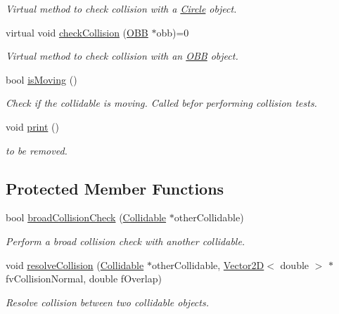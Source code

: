 \begin{DoxyCompactItemize}
\begin{DoxyCompactList}\small\item\em Virtual method to check collision with a \hyperlink{class_circle}{Circle} object. \end{DoxyCompactList}\item 
\hypertarget{class_collidable_a90789947098d0f6f43e3ef8a944a5657}{}virtual void \hyperlink{class_collidable_a90789947098d0f6f43e3ef8a944a5657}{check\+Collision} (\hyperlink{class_o_b_b}{O\+B\+B} $\ast$obb)=0\label{class_collidable_a90789947098d0f6f43e3ef8a944a5657}

\begin{DoxyCompactList}\small\item\em Virtual method to check collision with an \hyperlink{class_o_b_b}{O\+B\+B} object. \end{DoxyCompactList}\item 
\hypertarget{class_collidable_a8d46b697385b10bc9447f1ac18a587a6}{}bool \hyperlink{class_collidable_a8d46b697385b10bc9447f1ac18a587a6}{is\+Moving} ()\label{class_collidable_a8d46b697385b10bc9447f1ac18a587a6}

\begin{DoxyCompactList}\small\item\em Check if the collidable is moving. Called befor performing collision tests. \end{DoxyCompactList}\item 
\hypertarget{class_collidable_ac4597915c92e32ea10220808da31c750}{}void \hyperlink{class_collidable_ac4597915c92e32ea10220808da31c750}{print} ()\label{class_collidable_ac4597915c92e32ea10220808da31c750}

\begin{DoxyCompactList}\small\item\em to be removed. \end{DoxyCompactList}\end{DoxyCompactItemize}
\subsection*{Protected Member Functions}
\begin{DoxyCompactItemize}
\item 
bool \hyperlink{class_collidable_a3d3ce584cdb14485db044c81a792a966}{broad\+Collision\+Check} (\hyperlink{class_collidable}{Collidable} $\ast$other\+Collidable)
\begin{DoxyCompactList}\small\item\em Perform a broad collision check with another collidable. \end{DoxyCompactList}\item 
void \hyperlink{class_collidable_a40089393c9a030b68042e3b72d8142e4}{resolve\+Collision} (\hyperlink{class_collidable}{Collidable} $\ast$other\+Collidable, \hyperlink{class_vector2_d}{Vector2\+D}$<$ double $>$ $\ast$fv\+Collision\+Normal, double f\+Overlap)
\begin{DoxyCompactList}\small\item\em Resolve collision between two collidable objects. \end{DoxyCompactList}\end{DoxyCompactItemize}
